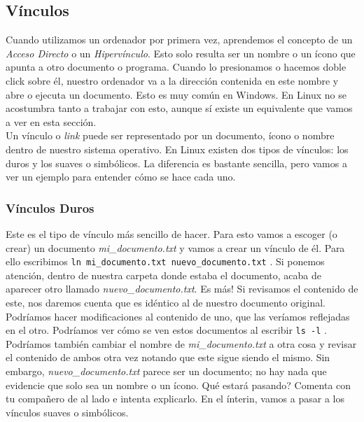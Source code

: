 \documentclass[10pt,letterpaper]{article}
\newcommand{\inlinecode}[1]{
\colorbox{light-gray}{\texttt{#1}}
}
\begin{document}
\subsection{V\'inculos}
Cuando utilizamos un ordenador por primera vez, aprendemos el concepto de un \emph{Acceso Directo} o un \emph{Hiperv\'inculo}. Esto solo resulta ser un nombre o un \'icono que apunta a otro documento o programa. Cuando lo presionamos o hacemos doble click sobre \'el, nuestro ordenador va a la direcci\'on contenida en este nombre y abre o ejecuta un documento. Esto es muy com\'un en Windows. En Linux no se acostumbra tanto a trabajar con esto, aunque s\'i existe un equivalente que vamos a ver en esta secci\'on.\\

Un v\'inculo o \emph{link} puede ser representado por un documento, \'icono o nombre dentro de nuestro sistema operativo. En Linux existen dos tipos de v\'inculos: los duros y los suaves o simb\'olicos. La diferencia es bastante sencilla, pero vamos a ver un ejemplo para entender c\'omo se hace cada uno.

\subsubsection{V\'inculos Duros}
Este es el tipo de v\'inculo m\'as sencillo de hacer. Para esto vamos a escoger (o crear) un documento \emph{mi\_documento.txt} y vamos a crear un v\'inculo de \'el. Para ello escribimos \inlinecode{ln mi\_documento.txt nuevo\_documento.txt}. Si ponemos atenci\'on, dentro de nuestra carpeta donde estaba el documento, acaba de aparecer otro llamado \emph{nuevo\_documento.txt}. Es m\'as! Si revisamos el contenido de este, nos daremos cuenta que es id\'entico al de nuestro documento original. Podr\'iamos hacer modificaciones al contenido de uno, que las ver\'iamos reflejadas en el otro. Podr\'iamos ver c\'omo se ven estos documentos al escribir \inlinecode{ls -l}. Podr\'iamos tambi\'en cambiar el nombre de \emph{mi\_documento.txt} a otra cosa y revisar el contenido de ambos otra vez notando que este sigue siendo el mismo. Sin embargo, \emph{nuevo\_documento.txt} parece ser un documento; no hay nada que evidencie que solo sea un nombre o un \'icono. Qu\'e estar\'a pasando? Comenta con tu compa\~nero de al lado e intenta explicarlo. En el \'interin, vamos a pasar a los v\'inculos suaves o simb\'olicos.
\end{document}
